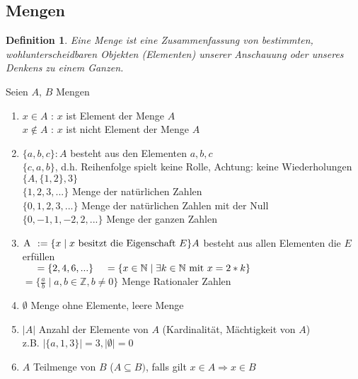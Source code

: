 \documentclass[a4paper,11pt]{article}
\newtheorem{definition}{Definition}[section]
\begin{document}
\subsection{Mengen}
\begin{definition}
Eine Menge ist eine Zusammenfassung von bestimmten, wohlunterscheidbaren Objekten (Elementen) unserer Anschauung oder unseres Denkens zu einem Ganzen.
\end{definition}
Seien $A$, $B$ Mengen
\begin{enumerate}[label=\alph*)]
	\item $x \in A$ : $x$ ist Element der Menge $A$ \\
	$x \notin A$ : $x$ ist nicht Element der Menge $A$
	\item {} \makebox[4mm][l]{=} $\{a, b, c\} : A$ besteht aus den Elementen $a, b, c$\\
	\makebox[4mm][l]{} \makebox[4mm][l]{=} $\{c, a, b\}$, d.h. Reihenfolge spielt keine Rolle,  Achtung: keine Wiederholungen\\
	  \makebox[4mm][l]{=} $\{A, \{1, 2\}, 3\}$\\
	 \makebox[4mm][l]{=} $\{1, 2, 3, ...\}$ Menge der natürlichen Zahlen\\
	 \makebox[4mm][l]{=} $\{0, 1, 2, 3, ...\}$ Menge der natürlichen Zahlen mit der Null\\
	 \makebox[4mm][l]{=} $\{0, -1, 1, -2, 2, ...\}$ Menge der ganzen Zahlen
	\item $\makebox[4mm][l]{A} := \{x \mid x \mbox{ besitzt die Eigenschaft } E\} A$ besteht aus allen Elementen die $E$ erfüllen\\
	$\makebox[4mm][l]{} = \{2, 4, 6, ...\} \\
	\makebox[4mm][l]{} = \{x \in \mathbb{N} \mid \exists k \in \mathbb{N} \mbox{ mit } x = 2*k\}$ \\
	 $ = \{\frac{a}{b} \mid a, b \in \mathbb{Z}, b \neq 0\}$ Menge Rationaler Zahlen
	\item $\emptyset$ Menge ohne Elemente, leere Menge
	\item $\vert A \vert $ Anzahl der Elemente von $A$ (Kardinalität, Mächtigkeit von $A$) \\
	z.B. $ \vert \{a, 1, 3\} \vert = 3, \vert \emptyset \vert = 0$
	\item $A$ Teilmenge von $B$ ($A \subseteq B)$, falls gilt $x \in A \Rightarrow x \in B$ \\

\end{enumerate}
\end{document}
